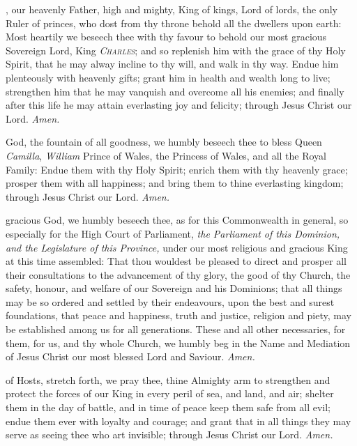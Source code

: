 , our heavenly Father, high and mighty, King of kings, Lord of lords, the only Ruler of princes, who dost from thy throne behold all the dwellers upon earth: Most heartily we beseech thee with thy favour to behold our most gracious Sovereign Lord, King \textsc{\textit{Charles}}; and so replenish him with the grace of thy Holy Spirit, that he may alway incline to thy will, and walk in thy way. Endue him plenteously with heavenly gifts; grant him in health and wealth long to live; strengthen him that he may vanquish and overcome all his enemies; and finally after this life he may attain everlasting joy and felicity; through Jesus Christ our Lord. \textit{Amen.}

 God, the fountain of all goodness, we humbly beseech thee to bless Queen \textit{Camilla}, \textit{William} Prince of Wales, the Princess of Wales, and all the Royal Family: Endue them with thy Holy Spirit; enrich them with thy heavenly grace; prosper them with all happiness; and bring them to thine everlasting kingdom; through Jesus Christ our Lord. \textit{Amen.}

 gracious God, we humbly beseech thee, as for this Commonwealth in general, so especially for the High Court of Parliament, \textit{the Parliament of this Dominion, and the Legislature of this Province,} under our most religious and gracious King at this time assembled: That thou wouldest be pleased to direct and prosper all their consultations to the advancement of thy glory, the good of thy Church, the safety, honour, and welfare of our Sovereign and his Dominions; that all things may be so ordered and settled by their endeavours, upon the best and surest foundations, that peace and happiness, truth and justice, religion and piety, may be established among us for all generations. These and all other necessaries, for them, for us, and thy whole Church, we humbly beg in the Name and Mediation of Jesus Christ our most blessed Lord and Saviour. \textit{Amen.}

 of Hosts, stretch forth, we pray thee, thine Almighty arm to strengthen and protect the forces of our King in every peril of sea, and land, and air; shelter them in the day of battle, and in time of peace keep them safe from all evil; endue them ever with loyalty and courage; and grant that in all things they may serve as seeing thee who art invisible; through Jesus Christ our Lord. \textit{Amen.}

